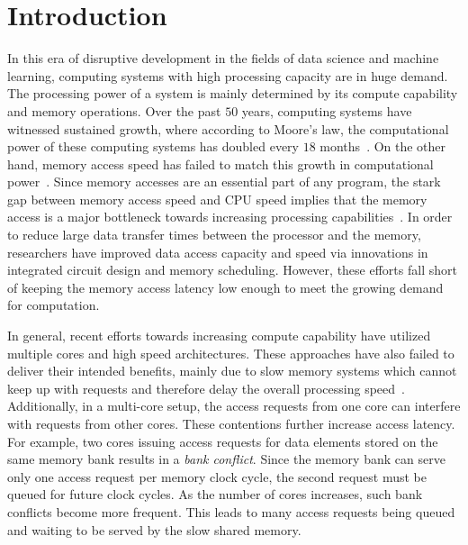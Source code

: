\section{Introduction}
\label{sec:intro}
In this era of disruptive development in the fields of data science and machine learning, computing systems with high processing capacity are in huge demand. The processing power of a system is mainly determined by its compute capability and memory operations. Over the past $50$ years, computing systems have witnessed sustained growth, where according to Moore's law, the computational power of these computing systems has doubled every $18$ months~\cite{Moore}. On the other hand, memory access speed has failed to match this growth in computational power~\cite{hennesey}. Since memory accesses are an essential part of any program, the stark gap between memory access speed and CPU speed implies that the memory access is a major bottleneck towards increasing processing capabilities~\cite{Wulf1995}. In order to reduce large data transfer times between the processor and the memory, researchers have improved data access capacity and speed via innovations in integrated circuit design and memory scheduling. However, these efforts fall short of keeping the memory access latency low enough to meet the growing demand for computation. 

In general, recent efforts towards increasing compute capability have utilized multiple cores and high speed architectures. These approaches have also failed to deliver their intended benefits, mainly due to slow memory systems which cannot keep up with requests and therefore delay the overall processing speed~\cite{zhao2006new,kapasi2003programmable,patterson1997case,hennesey}. Additionally, in a multi-core setup, the access requests from one core can interfere with requests from other cores. These contentions further increase access latency. For example, two cores issuing access requests for data elements stored on the same memory bank results in a {\em bank conflict}. Since the memory bank can serve only one access request per memory clock cycle, the second request must be queued for future clock cycles. As the number of cores increases, such bank conflicts become more frequent. This leads to many access requests being queued and waiting to be served by the slow shared memory.



